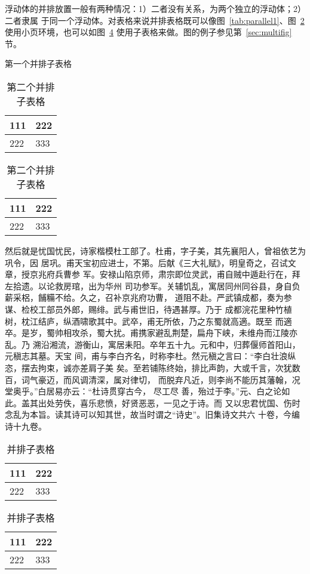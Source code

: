 浮动体的并排放置一般有两种情况：1）二者没有关系，为两个独立的浮动体；2）二者隶属
于同一个浮动体。对表格来说并排表格既可以像图~\ref{tab:parallel1}、图~\ref{tab:parallel2} 
使用小页环境，也可以如图~\ref{tab:subtable} 使用子表格来做。图的例子参见第~\ref{sec:multifig} 节。
\begin{table}[htbp]
\noindent\begin{minipage}{0.5\textwidth}
\centering
\caption{第一个并排子表格}
\label{tab:parallel1}
\begin{tabular}{p{2cm}p{2cm}}
\toprule[1.5pt]
111 & 222 \\\midrule[1pt]
222 & 333 \\\bottomrule[1.5pt]
\end{tabular}
\end{minipage}
\begin{minipage}{0.5\textwidth}
\centering
\caption{第二个并排子表格}
\label{tab:parallel2}
\begin{tabular}{p{2cm}p{2cm}}
\toprule[1.5pt]
111 & 222 \\\midrule[1pt]
222 & 333 \\\bottomrule[1.5pt]
\end{tabular}
\end{minipage}
\end{table}

然后就是忧国忧民，诗家楷模杜工部了。杜甫，字子美，其先襄阳人，曾祖依艺为巩令，因
居巩。甫天宝初应进士，不第。后献《三大礼赋》，明皇奇之，召试文章，授京兆府兵曹参
军。安禄山陷京师，肃宗即位灵武，甫自贼中遁赴行在，拜左拾遗。以论救房琯，出为华州
司功参军。关辅饥乱，寓居同州同谷县，身自负薪采梠，餔糒不给。久之，召补京兆府功曹，
道阻不赴。严武镇成都，奏为参谋、检校工部员外郎，赐绯。武与甫世旧，待遇甚厚。乃于
成都浣花里种竹植树，枕江结庐，纵酒啸歌其中。武卒，甫无所依，乃之东蜀就高適。既至
而適卒。是岁，蜀帅相攻杀，蜀大扰。甫携家避乱荆楚，扁舟下峡，未维舟而江陵亦乱。乃
溯沿湘流，游衡山，寓居耒阳。卒年五十九。元和中，归葬偃师首阳山，元稹志其墓。天宝
间，甫与李白齐名，时称李杜。然元稹之言曰：“李白壮浪纵恣，摆去拘束，诚亦差肩子美
矣。至若铺陈终始，排比声韵，大或千言，次犹数百，词气豪迈，而风调清深，属对律切，
而脱弃凡近，则李尚不能历其藩翰，况堂奥乎。”白居易亦云：“杜诗贯穿古今，  尽工尽
善，殆过于李。”元、白之论如此。盖其出处劳佚，喜乐悲愤，好贤恶恶，一见之于诗。而
又以忠君忧国、伤时念乱为本旨。读其诗可以知其世，故当时谓之“诗史”。旧集诗文共六
十卷，今编诗十九卷。

\begin{table}[htbp]
\centering
\caption{并排子表格}
\label{tab:subtable}
{
\begin{tabular}{p{2cm}p{2cm}}
\toprule[1.5pt]
111 & 222 \\\midrule[1pt]
222 & 333 \\\bottomrule[1.5pt]
\end{tabular}
}
\hskip2cm
{
\begin{tabular}{p{2cm}p{2cm}}
\toprule[1.5pt]
111 & 222 \\\midrule[1pt]
222 & 333 \\\bottomrule[1.5pt]
\end{tabular}
}
\end{table}

